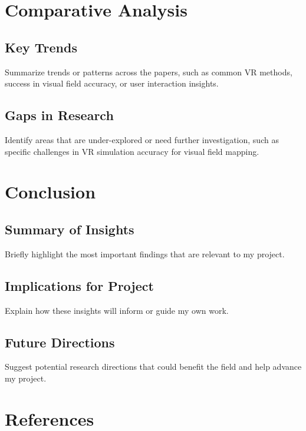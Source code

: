 \documentclass[11pt]{article}
\begin{document}
\newpage
\section{Comparative Analysis}
    \subsection{Key Trends}
     Summarize trends or patterns across the papers, such as common VR methods, success in visual field accuracy, or user interaction insights.
    \subsection{Gaps in Research}
     Identify areas that are under-explored or need further investigation, such as specific challenges in VR simulation accuracy for visual field mapping.

\section{Conclusion}
    \subsection{Summary of Insights}
     Briefly highlight the most important findings that are relevant to my project.
    \subsection{Implications for Project}
     Explain how these insights will inform or guide my own work.
    \subsection{Future Directions}
     Suggest potential research directions that could benefit the field and help advance my project.

\newpage
\section{References}
\end{document}
